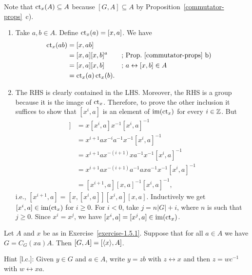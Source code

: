 \begin{solution} Note that $\operatorname{\operatorname{ct}}_x(A)\subseteq A$ because $[G,A]\subseteq A$ by Proposition~\ref{commutator-props}~c).

\begin{enumerate}[\upshape a)]
    \item Take $a,b\in A$. Define $\operatorname{\operatorname{ct}}_x(a)=[x,a]$. We have
    \begin{align*}
        \operatorname{\operatorname{ct}}_x(ab) &= [x,ab]\\
            &= [x,a][x,b]^a &&\textrm{; Prop.~\ref{commutator-props}~b)}\\
            &= [x,a][x,b]   &&\textrm{; }a\leftrightarrow[x,b]\in A\\
            &= \operatorname{\operatorname{ct}}_x(a)\operatorname{\operatorname{ct}}_x(b).
    \end{align*}

    \item The RHS is clearly contained in the LHS. Moreover, the RHS is a group because it is the image of $\operatorname{\operatorname{ct}}_x$. Therefore, to prove the other inclusion it suffices to show that $[x^i,a]$ is an element of $\operatorname{im}(\operatorname{\operatorname{ct}}_x)$ for every $i\in\mathbb{Z}$. But
    \begin{align*}
        [x,[x^i,a]] &= x[x^i,a]x^{-1}[x^i,a]^{-1}\\
            &= x^{i+1}ax^{-i}a^{-1}x^{-1}[x^i,a]^{-1}\\
            &= x^{i+1}ax^{-(i+1)}xa^{-1}x^{-1}[x^i,a]^{-1}\\
            &= x^{i+1}ax^{-(i+1)}a^{-1}axa^{-1}x^{-1}[x^i,a]^{-1}\\
            &= [x^{i+1},a][x,a]^{-1}[x^i,a]^{-1},
    \end{align*}
    i.e., $[x^{i+1},a]=[x,[x^i,a]][x^i,a][x,a]$. Inductively we get $[x^i,a]\in\operatorname{im}(\operatorname{\operatorname{ct}}_x)$ for $i\ge0$. For $i<0$, take $j=n|G|+i$, where $n$ is such that $j\ge0$. Since $x^i=x^j$, we have $[x^i,a]=[x^j,a]\in\operatorname{im}(\operatorname{\operatorname{ct}}_x)$.
\end{enumerate}
\end{solution}

\begin{exr}
    Let\/ $A$ and\/ $x$ be as in\/ \textrm{\upshape Exercise~\ref{exercise-1.5.1}}. Suppose that for all\/ $a\in A$ we have $G = C_G(xa)A$. Then\/ $[G,A]=[\langle x\rangle,A]$.

    \textrm{\upshape Hint [l.c.]: Given $y\in G$ and $a\in A$, write $y=zb$ with $z\leftrightarrow x$ and then $z=wc^{-1}$ with $w\leftrightarrow xa$.}
\end{exr}

